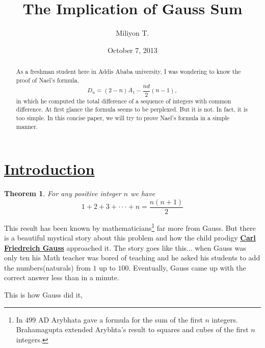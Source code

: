 \documentclass[12pt]{article}
\newtheorem{thm}{Theorem}[section]
\theoremstyle{definition}
\theoremstyle{remark}
\begin{document}
\nocite{}

\title{The Implication of Gauss Sum}

\author{Miliyon T.}
\date{October 7, 2013}
\maketitle

\begin{abstract}
  As a freshman student here in Addis Ababa university, I was wondering to know the proof of Nael's formula,
      $$D_n=(2-n) A_1-\frac{nd}{2}(n-1),$$
  in which he computed the total difference of a sequence of integers with common difference. At first glance the formula seems to be perplexed. But it is not. In fact, it is too simple. In this concise paper, we will try to prove Nael's formula in a simple manner.
\end{abstract}

\section{\href{www.albohessab.weebly.com}{Introduction}}
\begin{thm}\label{the01} For any positive integer $n$ we have
\begin{equation}
1+2+3+\cdot\cdot\cdot +n=\frac{n(n+1)}{2}
\end{equation}
\end{thm}

\noindent This result has been known by mathematicians\footnote{In $499$ AD Arybhata gave a formula for the sum of the first $n$ integers. Brahamagupta extended Arybhta's result to squares and cubes of the first $n$ integers.} far more from Gauss. But there is a beautiful mystical story about this problem and how the child prodigy \href{www.wikipedia.org/Gauss}{\textbf{Carl Friedreich Gauss}} approached it.
The story goes like this$\ldots$ when Gauss was only ten his Math teacher was bored of teaching and he asked his students to add the numbers(naturals) from $1$ up to $100$. Eventually, Gauss came up with the correct answer less than in a minute.

\medskip

\noindent This is how Gauss did it,

\medskip
\end{document}
